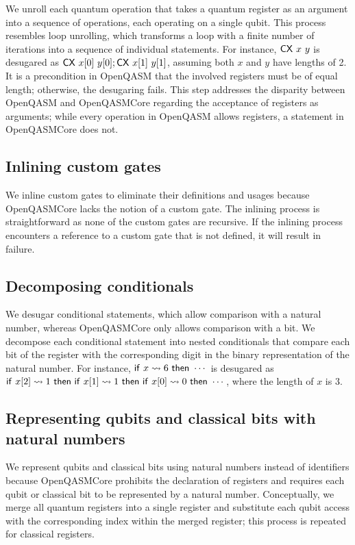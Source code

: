\noindent
We unroll each quantum operation that takes a quantum register as an argument
into a sequence of operations, each operating on a single qubit.
%
This process resembles loop unrolling, which transforms a loop with a finite
number of iterations into a sequence of individual statements.
%
For instance, $\mathsf{CX}\ x\ y$ is desugared as
$\mathsf{CX}\ x[0]\ y[0];\mathsf{CX}\ x[1]\ y[1]$, assuming both $x$ and $y$ have lengths
of 2.
%
It is a precondition in OpenQASM that the involved registers must be of equal
length; otherwise, the desugaring fails.
%
This step addresses the disparity between OpenQASM and OpenQASMCore regarding
the acceptance of registers as arguments;
%
while every operation in OpenQASM allows registers, a statement in OpenQASMCore
does not.

\subsection{Inlining custom gates}
\label{ch:openqasm:desugaring:inlining}

\noindent
We inline custom gates to eliminate their definitions and usages because
OpenQASMCore lacks the notion of a custom gate.
%
The inlining process is straightforward as none of the custom gates are
recursive.
%
If the inlining process encounters a reference to a custom gate that is not
defined, it will result in failure.

\subsection{Decomposing conditionals}
\label{ch:openqasm:desugaring:conditional}

\noindent
We desugar conditional statements, which allow comparison with a natural
number, whereas OpenQASMCore only allows comparison with a bit.
%
We decompose each conditional statement into nested conditionals that compare
each bit of the register with the corresponding digit in the binary
representation of the natural number.
%
For instance, $\mathsf{if}\ x\rightsquigarrow6\ \mathsf{then}\ \cdots$ is desugared as
$\mathsf{if}\ x[2]\rightsquigarrow1\ \mathsf{then}\ \mathsf{if}\ x[1]\rightsquigarrow1\ \mathsf{then}\ \mathsf{if}\ x[0]\rightsquigarrow0\ \mathsf{then}\ \cdots$, where the length of $x$
is $3$.

\subsection{Representing qubits and classical bits with natural numbers}
\label{ch:openqasm:desugaring:register}

\noindent
We represent qubits and classical bits using natural numbers instead of
identifiers because OpenQASMCore prohibits the declaration of registers and
requires each qubit or classical bit to be represented by a natural number.
%
Conceptually, we merge all quantum registers into a single register and
substitute each qubit access with the corresponding index within the merged
register;
%
this process is repeated for classical registers.

